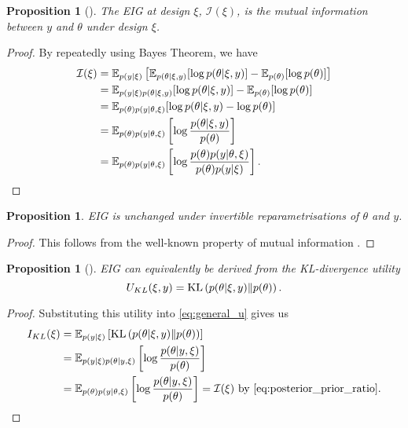 \documentclass[a4paper, 10pt]{report}
\theoremstyle{plain}
\newtheorem{proposition}[theorem]{Proposition}
\begin{document}
	
	\begin{proposition}[\citet{lindley1956}]
		\label{prop:mi}
		The EIG at design $\xi$, $\mathcal{I}(\xi)$, is the mutual information between $y$ and $\theta$ under design $\xi$.
	\end{proposition}
	\begin{proof} By repeatedly using Bayes Theorem, we have
		\begin{align}
		\mathcal{I}(\xi) &= \mathbb{E}_{p(y|\xi)}\left[ \mathbb{E}_{p(\theta|\xi,y)}[\log p(\theta|\xi,y)]-\mathbb{E}_{p(\theta)}[\log p(\theta)] \right]\\
		&= \mathbb{E}_{p(y|\xi)p(\theta|\xi,y)}[\log p(\theta|\xi,y)] - \mathbb{E}_{p(\theta)}[\log p(\theta)]\\
		&= \mathbb{E}_{p(\theta)p(y|\theta,\xi)}[\log p(\theta|\xi,y)-\log p(\theta)]\\
		\label{eq:posterior_prior_ratio}
		&= \mathbb{E}_{p(\theta)p(y|\theta,\xi)}\left[\log \frac{p(\theta|\xi,y)}{p(\theta)}\right]\\
		&= \mathbb{E}_{p(\theta)p(y|\theta,\xi)}\left[\log \frac{p(\theta)p(y|\theta,\xi)}{p(\theta)p(y|\xi)}\right].
		\end{align}
	\end{proof}
	
	\begin{proposition}
		EIG is unchanged under invertible reparametrisations of $\theta$ and $y$.
	\end{proposition}
	\begin{proof}
		This follows from the well-known property of mutual information \citep{cover1999elements}.
	\end{proof}
	
	\begin{proposition}[\citet{bernardo1979expected}]
		EIG can equivalently be derived from the KL-divergence utility
		\begin{equation}
		U_{KL}(\xi,y) = \textup{KL}\left(p(\theta|\xi,y)  \| p(\theta) \right).
		\end{equation}
	\end{proposition}
	\begin{proof}
		Substituting this utility into \eqref{eq:general_u} gives us
		\begin{align}
		I_{KL}(\xi) &= \E_{p(y|\xi)}\left[ \text{KL}\left(p(\theta|\xi,y)  \| p(\theta) \right) \right] \\
		&= \E_{p(y|\xi)p(\theta|y,\xi)}\left[ \log \frac{p(\theta|y,\xi)}{p(\theta)} \right] \\
		&= \E_{p(\theta)p(y|\theta,\xi)}\left[ \log \frac{p(\theta|y,\xi)}{p(\theta)} \right] = \mathcal{I}(\xi) \text{ by \eqref{eq:posterior_prior_ratio}}.
		\end{align}
	\end{proof}
	
\end{document}
